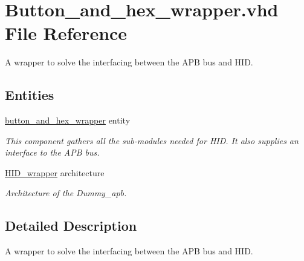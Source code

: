 \hypertarget{Button__and__hex__wrapper_8vhd}{\section{Button\-\_\-and\-\_\-hex\-\_\-wrapper.\-vhd File Reference}
\label{Button__and__hex__wrapper_8vhd}
}


A wrapper to solve the interfacing between the A\-P\-B bus and H\-I\-D.  


\subsection*{Entities}
\begin{DoxyCompactItemize}
\item 
\hyperlink{classbutton__and__hex__wrapper}{button\-\_\-and\-\_\-hex\-\_\-wrapper} entity
\begin{DoxyCompactList}\small\item\em This component gathers all the sub-\/modules needed for H\-I\-D. It also supplies an interface to the A\-P\-B bus. \end{DoxyCompactList}\item 
\hyperlink{classbutton__and__hex__wrapper_1_1HID__wrapper}{H\-I\-D\-\_\-wrapper} architecture
\begin{DoxyCompactList}\small\item\em Architecture of the Dummy\-\_\-apb. \end{DoxyCompactList}\end{DoxyCompactItemize}


\subsection{Detailed Description}
A wrapper to solve the interfacing between the A\-P\-B bus and H\-I\-D. 